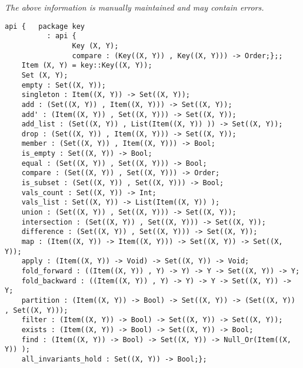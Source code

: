 \label{api:Setxy}

{\tiny \it The above information is manually maintained and may contain errors.}
\begin{verbatim}
api {   package key
          : api {
                Key (X, Y);
                compare : (Key((X, Y)) , Key((X, Y))) -> Order;};;
    Item (X, Y) = key::Key((X, Y));
    Set (X, Y);
    empty : Set((X, Y));
    singleton : Item((X, Y)) -> Set((X, Y));
    add : (Set((X, Y)) , Item((X, Y))) -> Set((X, Y));
    add' : (Item((X, Y)) , Set((X, Y))) -> Set((X, Y));
    add_list : (Set((X, Y)) , List(Item((X, Y)) )) -> Set((X, Y));
    drop : (Set((X, Y)) , Item((X, Y))) -> Set((X, Y));
    member : (Set((X, Y)) , Item((X, Y))) -> Bool;
    is_empty : Set((X, Y)) -> Bool;
    equal : (Set((X, Y)) , Set((X, Y))) -> Bool;
    compare : (Set((X, Y)) , Set((X, Y))) -> Order;
    is_subset : (Set((X, Y)) , Set((X, Y))) -> Bool;
    vals_count : Set((X, Y)) -> Int;
    vals_list : Set((X, Y)) -> List(Item((X, Y)) );
    union : (Set((X, Y)) , Set((X, Y))) -> Set((X, Y));
    intersection : (Set((X, Y)) , Set((X, Y))) -> Set((X, Y));
    difference : (Set((X, Y)) , Set((X, Y))) -> Set((X, Y));
    map : (Item((X, Y)) -> Item((X, Y))) -> Set((X, Y)) -> Set((X, Y));
    apply : (Item((X, Y)) -> Void) -> Set((X, Y)) -> Void;
    fold_forward : ((Item((X, Y)) , Y) -> Y) -> Y -> Set((X, Y)) -> Y;
    fold_backward : ((Item((X, Y)) , Y) -> Y) -> Y -> Set((X, Y)) -> Y;
    partition : (Item((X, Y)) -> Bool) -> Set((X, Y)) -> (Set((X, Y)) , Set((X, Y)));
    filter : (Item((X, Y)) -> Bool) -> Set((X, Y)) -> Set((X, Y));
    exists : (Item((X, Y)) -> Bool) -> Set((X, Y)) -> Bool;
    find : (Item((X, Y)) -> Bool) -> Set((X, Y)) -> Null_Or(Item((X, Y)) );
    all_invariants_hold : Set((X, Y)) -> Bool;};
\end{verbatim}

